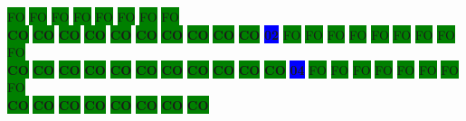 \colorbox{green}{\color[gray]{0.75}FO}%
\colorbox{green}{\color[gray]{0.75}FO}%
\colorbox{green}{\color[gray]{0.75}FO}%
\colorbox{green}{\color[gray]{0.75}FO}%
\colorbox{green}{\color[gray]{0.75}FO}%
\colorbox{green}{\color[gray]{0.75}FO}%
\colorbox{green}{\color[gray]{0.75}FO}%
\colorbox{green}{\color[gray]{0.75}FO}%
\\
\colorbox{green}{\color[rgb]{0,0,0}\textbf{CO}}%
\colorbox{green}{\color[rgb]{0,0,0}\textbf{CO}}%
\colorbox{green}{\color[rgb]{0,0,0}\textbf{CO}}%
\colorbox{green}{\color[rgb]{0,0,0}\textbf{CO}}%
\colorbox{green}{\color[rgb]{0,0,0}\textbf{CO}}%
\colorbox{green}{\color[rgb]{0,0,0}\textbf{CO}}%
\colorbox{green}{\color[rgb]{0,0,0}\textbf{CO}}%
\colorbox{green}{\color[rgb]{0,0,0}\textbf{CO}}%
\colorbox{green}{\color[rgb]{0,0,0}\textbf{CO}}%
\colorbox{green}{\color[rgb]{0,0,0}\textbf{CO}}%
\colorbox{blue}{\color[rgb]{1,0,0}\textbf{02}}%
\colorbox{green}{\color[gray]{0.75}FO}%
\colorbox{green}{\color[gray]{0.75}FO}%
\colorbox{green}{\color[gray]{0.75}FO}%
\colorbox{green}{\color[gray]{0.75}FO}%
\colorbox{green}{\color[gray]{0.75}FO}%
\colorbox{green}{\color[gray]{0.75}FO}%
\colorbox{green}{\color[gray]{0.75}FO}%
\colorbox{green}{\color[gray]{0.75}FO}%
\colorbox{green}{\color[gray]{0.75}FO}%
\\
\colorbox{green}{\color[rgb]{0,0,0}\textbf{CO}}%
\colorbox{green}{\color[rgb]{0,0,0}\textbf{CO}}%
\colorbox{green}{\color[rgb]{0,0,0}\textbf{CO}}%
\colorbox{green}{\color[rgb]{0,0,0}\textbf{CO}}%
\colorbox{green}{\color[rgb]{0,0,0}\textbf{CO}}%
\colorbox{green}{\color[rgb]{0,0,0}\textbf{CO}}%
\colorbox{green}{\color[rgb]{0,0,0}\textbf{CO}}%
\colorbox{green}{\color[rgb]{0,0,0}\textbf{CO}}%
\colorbox{green}{\color[rgb]{0,0,0}\textbf{CO}}%
\colorbox{green}{\color[rgb]{0,0,0}\textbf{CO}}%
\colorbox{green}{\color[rgb]{0,0,0}\textbf{CO}}%
\colorbox{blue}{\color[rgb]{1,0,0}\textbf{04}}%
\colorbox{green}{\color[gray]{0.75}FO}%
\colorbox{green}{\color[gray]{0.75}FO}%
\colorbox{green}{\color[gray]{0.75}FO}%
\colorbox{green}{\color[gray]{0.75}FO}%
\colorbox{green}{\color[gray]{0.75}FO}%
\colorbox{green}{\color[gray]{0.75}FO}%
\colorbox{green}{\color[gray]{0.75}FO}%
\colorbox{green}{\color[gray]{0.75}FO}%
\\
\colorbox{green}{\color[rgb]{0,0,0}\textbf{CO}}%
\colorbox{green}{\color[rgb]{0,0,0}\textbf{CO}}%
\colorbox{green}{\color[rgb]{0,0,0}\textbf{CO}}%
\colorbox{green}{\color[rgb]{0,0,0}\textbf{CO}}%
\colorbox{green}{\color[rgb]{0,0,0}\textbf{CO}}%
\colorbox{green}{\color[rgb]{0,0,0}\textbf{CO}}%
\colorbox{green}{\color[rgb]{0,0,0}\textbf{CO}}%
\colorbox{green}{\color[rgb]{0,0,0}\textbf{CO}}%
